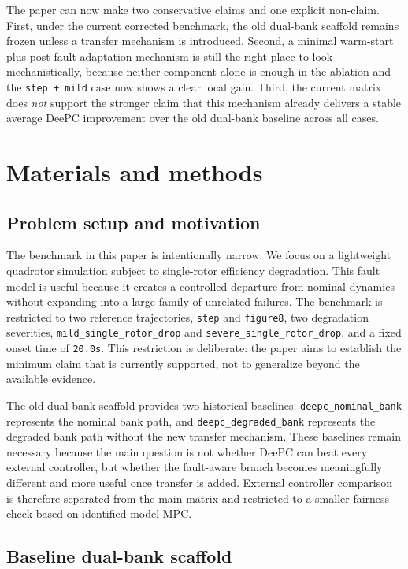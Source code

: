 \documentclass[12pt,a4paper]{article}
\begin{document}
The paper can now make two conservative claims and one explicit non-claim. First, under the current corrected benchmark, the old dual-bank scaffold remains frozen unless a transfer mechanism is introduced. Second, a minimal warm-start plus post-fault adaptation mechanism is still the right place to look mechanistically, because neither component alone is enough in the ablation and the \texttt{step + mild} case now shows a clear local gain. Third, the current matrix does \emph{not} support the stronger claim that this mechanism already delivers a stable average DeePC improvement over the old dual-bank baseline across all cases.

\section{Materials and methods}

\subsection{Problem setup and motivation}

The benchmark in this paper is intentionally narrow. We focus on a lightweight quadrotor simulation subject to single-rotor efficiency degradation. This fault model is useful because it creates a controlled departure from nominal dynamics without expanding into a large family of unrelated failures. The benchmark is restricted to two reference trajectories, \texttt{step} and \texttt{figure8}, two degradation severities, \texttt{mild\_single\_rotor\_drop} and \texttt{severe\_single\_rotor\_drop}, and a fixed onset time of \texttt{20.0s}. This restriction is deliberate: the paper aims to establish the minimum claim that is currently supported, not to generalize beyond the available evidence.

The old dual-bank scaffold provides two historical baselines. \texttt{deepc\_nominal\_bank} represents the nominal bank path, and \texttt{deepc\_degraded\_bank} represents the degraded bank path without the new transfer mechanism. These baselines remain necessary because the main question is not whether DeePC can beat every external controller, but whether the fault-aware branch becomes meaningfully different and more useful once transfer is added. External controller comparison is therefore separated from the main matrix and restricted to a smaller fairness check based on identified-model MPC.

\subsection{Baseline dual-bank scaffold}
\end{document}
